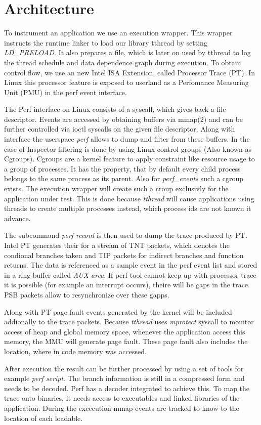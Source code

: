 \section{Architecture}
\label{sec:introduction}

To instrument an application we use an execution wrapper. This wrapper instructs
the runtime linker to load our library tthread by setting \emph{LD\_PRELOAD}. It
also prepares a file, which is later on used by tthread to log the thread
schedule and data dependence graph during execution. To obtain control flow,
we use an new Intel ISA Extension, called Processor Trace (PT).
In Linux this processor feature is exposed to userland as a Perfomance Measuring
Unit (PMU) in the perf event interface.

The Perf interface on Linux consists of a syscall, which gives back a file
descriptor. Events are accessed by obtaining buffers via mmap(2) and can be
further controlled via ioctl syscalls on the given file descriptor. Along with
interface the userspace \emph{perf} allows to dump and filter from these
buffers. In the case of Inspector filtering is done by using Linux control
groups (Also known as Cgroups). Cgroups are a kernel feature to apply constraint
like resource usage to a group of processes. It has the property, that by
default every child process belongs to the same process as its parent. Also for
\emph{perf\_events} such a cgroup exists. The execution wrapper will create such
a croup exclusivly for the application under test. This is done because
\emph{tthread} will cause applications using threads to create multiple
processes instead, which process ids are not known it advance.

The subcommand \emph{perf record} is then used to dump the trace produced by PT.
Intel PT generates their for a stream of TNT packets, which denotes the
condional branches taken and TIP packets for indirect branches and function
returns. The data is referenced as a sample event in the perf event list and
stored in a ring buffer called \emph{AUX area}. If perf tool cannot
keep up with processor trace it is possible (for example an interrupt occurs),
theire will be gaps in the trace. PSB packets allow to resynchronize over these
gapps.

Along with PT page fault events generated by the kernel will be included
addionally to the trace packets. Because \emph{tthread} uses \emph{mprotect}
syscall to monitor access of heap and global memory space, whenever the
application access this memory, the MMU will generate page fault. These
page fault also includes the location, where in code memory was accessed.

After execution the result can be further processed by using a set of tools
for example \emph{perf script}. The branch information is still in a compressed
form and needs to be decoded. Perf has a decoder integrated to achieve this.
To map the trace onto binaries, it needs access to executables and linked
libraries of the application. During the excecution mmap events are tracked to
know to the location of each loadable.
